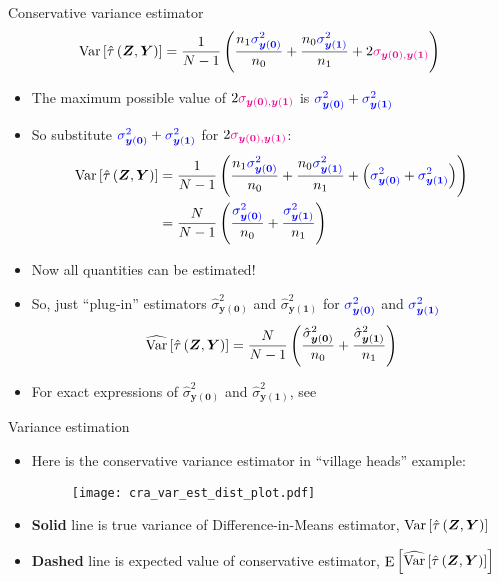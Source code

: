 \documentclass[table, xcolor = {dvipsnames}, 9pt]{beamer}
\theoremstyle{plain}
\newcommand{\bh}[1]{{\color{blue}{#1}}}
\newcommand{\mh}[1]{{\color{magenta}{#1}}}
\DeclareMathOperator{\E}{\rm{E}}
\DeclareMathOperator{\Var}{\rm{Var}}
\begin{document}
\begin{frame}{Conservative variance estimator} 
\begin{equation*}
\Var\left[\hat{\tau}\left(\bm{Z}, \bm{Y}\right)\right] = \frac{1}{N - 1}\left(\frac{n_1 \bh{\sigma^2_{\bm{y}(\bm{0})}}}{n_0} + \frac{n_0 \bh{\sigma^2_{\bm{y}(\bm{1})}}}{n_1} + 2\mh{\sigma_{\bm{y}(\bm{0}), \bm{y}(\bm{1})}}\right)
\end{equation*} \pause
\begin{itemize}
\item The maximum possible value of $2\mh{\sigma_{\bm{y}(\bm{0}), \bm{y}(\bm{1})}}$ is $\bh{\sigma^2_{\bm{y}(\bm{0})}} + \bh{\sigma^2_{\bm{y}(\bm{1})}}$ 
\item So substitute $\bh{\sigma^2_{\bm{y}(\bm{0})}} + \bh{\sigma^2_{\bm{y}(\bm{1})}}$ for $2\mh{\sigma_{\bm{y}(\bm{0}), \bm{y}(\bm{1})}}$: \pause
\begin{align*}
\Var\left[\hat{\tau}\left(\bm{Z}, \bm{Y}\right)\right] & = \frac{1}{N - 1}\left(\frac{n_1 \bh{\sigma^2_{\bm{y}(\bm{0})}}}{n_0} + \frac{n_0 \bh{\sigma^2_{\bm{y}(\bm{1})}}}{n_1} + \left(\bh{\sigma^2_{\bm{y}(\bm{0})}} + \bh{\sigma^2_{\bm{y}(\bm{1})}}\right)\right) \\
& = \frac{N}{N - 1}\left(\frac{\bh{\sigma^2_{\bm{y}(\bm{0})}}}{n_0} + \frac{\bh{\sigma^2_{\bm{y}(\bm{1})}}}{n_1}\right)
\end{align*} \pause
\item Now all quantities can be estimated! \pause
\item So, just ``plug-in'' estimators $\hat{\sigma}^2_{\bm{y}(\bm{0})}$ and $\hat{\sigma}^2_{\bm{y}(\bm{1})}$ for $\bh{\sigma^2_{\bm{y}(\bm{0})}}$ and $\bh{\sigma^2_{\bm{y}(\bm{1})}}$
\begin{equation}
\widehat{\Var}\left[\hat{\tau}\left(\bm{Z}, \bm{Y}\right)\right] = \frac{N}{N - 1}\left(\frac{\hat{\sigma}^2_{\bm{y}(\bm{0})}}{n_0} + \frac{\hat{\sigma}^2_{\bm{y}(\bm{1})}}{n_1} \right)
\end{equation}
\item For exact expressions of $\hat{\sigma}^2_{\bm{y}(\bm{0})}$ and $\hat{\sigma}^2_{\bm{y}(\bm{1})}$, see \hyperlink{Variance estimators}{}
\end{itemize}
\end{frame}
\begin{frame}{Variance estimation} 
\vfill
\begin{itemize} \vfill
\item Here is the conservative variance estimator in ``village heads'' example: \vfill
\begin{figure}[H]
\texttt{[image: cra\_var\_est\_dist\_plot.pdf]}
\end{figure} \vfill
\item[] \small \textbf{Solid} line is true variance of Difference-in-Means estimator, $\Var\left[\hat{\tau}\left(\bm{Z}, \bm{Y}\right)\right]$  \vfill
\item[] \textbf{Dashed} line is expected value of conservative estimator, $\E\left[\widehat{\Var}\left[\hat{\tau}\left(\bm{Z}, \bm{Y}\right)\right]\right]$ \normalsize \vfill
\end{itemize} \vfill
\end{frame}
\end{document}
